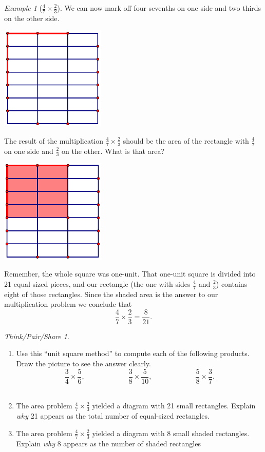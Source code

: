 \documentclass[10pt, reqno]{amsart}
\theoremstyle{remark}
\newtheorem{example}[thm]{Example}
\newtheorem*{thinkpair*}{Think/Pair/Share}
\theoremstyle{definition}
\numberwithin{equation}{section}  %
\begin{document}
\begin{example}[$\frac 4 7 \times \frac 2 3$]
We can now mark off four sevenths on one side  and two thirds on the other side.
\begin{center}
\includegraphics[width = 5cm]{unitsqdiv3}
\end{center}
The result of the multiplication $\frac 4 7 \times \frac 2 3$ should be the area of the rectangle with $\frac 47$ on one side and $\frac 23 $ on the other.  What is that area?
\begin{center}
\includegraphics[width = 5cm]{areamodel2}
\end{center}
Remember, the whole square was one-unit.  That one-unit square is divided into 21 equal-sized pieces, and our rectangle (the one with sides $\frac 4 7$ and $\frac 2 3$) contains eight of those rectangles. 
Since the shaded area is the answer to our multiplication problem we conclude that
\[
\frac 47 \times \frac 23 = \frac 8{21}.
\]
\end{example}


\begin{thinkpair*}\ 

\begin{enumerate}
\item
Use this ``unit square method'' to compute each of the following products. 
Draw the picture to
see the answer clearly.
\[
\frac 3 4 \times \frac 5 6,
\qquad\qquad\qquad
\frac 3 8 \times \frac 5{10},
\qquad\qquad\qquad
\frac 5 8 \times \frac 3 7 .
\]\\

\item
The area problem $\frac 4 7 \times \frac 2 3$
yielded a diagram with 21 small rectangles. 
Explain \emph{why} 21 appears as the total number of equal-sized rectangles.\\


\item
The area problem $\frac 4 7 \times \frac 2 3$
yielded a diagram with 8 small shaded rectangles. 
Explain \emph{why} 8 appears as the number of shaded rectangles\\
\end{enumerate}

\end{thinkpair*}
\end{document}
